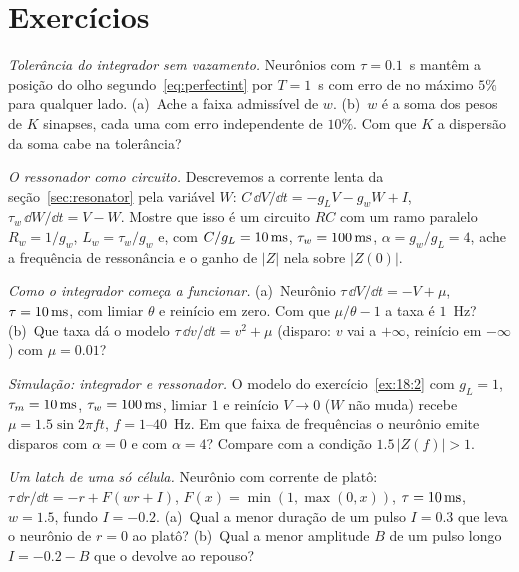 \section{Exercícios}

\begin{exercise}[\lvlA]
\label{ex:18:1}
\emph{Tolerância do integrador sem vazamento.} Neurônios com $\tau=0.1$~s mantêm a posição do olho segundo~\eqref{eq:perfectint} por $T=1$~s com erro de no máximo $5\%$ para qualquer lado. (a)~Ache a faixa admissível de $w$. (b)~$w$ é a soma dos pesos de $K$ sinapses, cada uma com erro independente de $10\%$. Com que $K$ a dispersão da soma cabe na tolerância?
\end{exercise}

\begin{exercise}[\lvlB]
\label{ex:18:2}
\emph{O ressonador como circuito.} Descrevemos a corrente lenta da seção~\ref{sec:resonator} pela variável $W$: $C\,\dd V/\dd t=-g_LV-g_wW+I$, $\tau_w\,\dd W/\dd t=V-W$. Mostre que isso é um circuito $RC$ com um ramo paralelo $R_w=1/g_w$, $L_w=\tau_w/g_w$ e, com $C/g_L=10\,\text{ms}$, $\tau_w=100\,\text{ms}$, $\alpha=g_w/g_L=4$, ache a frequência de ressonância e o ganho de $|Z|$ nela sobre $|Z(0)|$.
\end{exercise}

\begin{exercise}[\lvlB]
\label{ex:18:3}
\emph{Como o integrador começa a funcionar.} (a)~Neurônio $\tau\,\dd V/\dd t=-V+\mu$, $\tau=10\,\text{ms}$, com limiar $\theta$ e reinício em zero. Com que $\mu/\theta-1$ a taxa é $1$~Hz? (b)~Que taxa dá o modelo $\tau\,\dd v/\dd t=v^2+\mu$ (disparo: $v$ vai a $+\infty$, reinício em $-\infty$) com $\mu=0.01$?
\end{exercise}

\begin{exercise}[\lvlB]
\label{ex:18:4}
\emph{Simulação: integrador e ressonador.} O modelo do exercício~\ref{ex:18:2} com $g_L=1$, $\tau_m=10\,\text{ms}$, $\tau_w=100\,\text{ms}$, limiar $1$ e reinício $V\to0$ ($W$ não muda) recebe $\mu=1.5\sin2\pi ft$, $f=1$--$40$~Hz. Em que faixa de frequências o neurônio emite disparos com $\alpha=0$ e com $\alpha=4$? Compare com a condição $1.5\,|Z(f)|>1$.
\end{exercise}

\begin{exercise}[\lvlB]
\label{ex:18:5}
\emph{Um latch de uma só célula.} Neurônio com corrente de platô: $\tau\,\dd r/\dd t=-r+F(wr+I)$, $F(x)=\min(1,\max(0,x))$, $\tau=10\,\text{ms}$, $w=1.5$, fundo $I=-0.2$. (a)~Qual a menor duração de um pulso $I=0.3$ que leva o neurônio de $r=0$ ao platô? (b)~Qual a menor amplitude $B$ de um pulso longo $I=-0.2-B$ que o devolve ao repouso?
\end{exercise}


